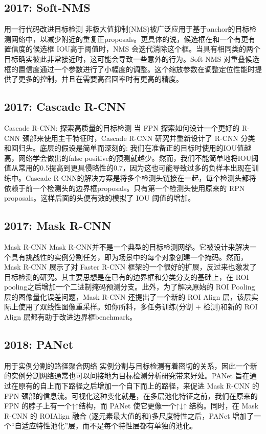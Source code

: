 \documentclass{article}
\begin{document}
	\subsection{2017: Soft-NMS}
	
	用一行代码改进目标检测
	非极大值抑制(NMS)被广泛应用于基于anchor的目标检测网络中，以减少附近的重复正proposals。更具体的说，候选框在和一个有更有置信度的候选框 IOU高于阈值时，NMS 会迭代消除这个框。当具有相同类的两个目标确实彼此非常接近时，这可能会导致一些意外的行为。Soft-NMS 对重叠候选框的置信度通过一个参数进行了小幅度的调整。这个缩放参数在调整定位性能时提供了更多的控制，并且在需要高召回率时有更高的精度。
	\subsection{2017: Cascade R-CNN}
	
	Cascade R-CNN: 探索高质量的目标检测
	当 FPN 探索如何设计一个更好的 R-CNN 颈部来使用主干特征时，Cascade R-CNN 研究并重新设计了 R-CNN 分类和回归头。底层的假设是简单而深刻的: 我们在准备正的目标时使用的IOU值越高，网络学会做出的false positive的预测就越少。然而，我们不能简单地将IOU阈值从常用的0.5提高到更具侵略性的0.7，因为这也可能导致过多的负样本出现在训练中。Cascade R-CNN的解决方案是将多个检测头链接在一起，每个检测头都将依赖于前一个检测头的边界框proposals。只有第一个检测头使用原来的 RPN proposals。这样后面的头便有效的模拟了 IOU 阈值的增加。
	\subsection{2017: Mask R-CNN}
	
	Mask R-CNN
	Mask R-CNN并不是一个典型的目标检测网络。它被设计来解决一个具有挑战性的实例分割任务，即为场景中的每个对象创建一个掩码。然而，Mask R-CNN 展示了对 Faster R-CNN 框架的一个很好的扩展，反过来也激发了目标检测的研究。其主要思想是在已有的边界框和分类分支的基础上，在 ROI pooling之后增加一个二进制掩码预测分支。此外，为了解决原始的 ROI Pooling 层的图像量化误差问题，Mask R-CNN 还提出了一个新的 ROI Align 层，该层实际上使用了双线性图像重采样。如你所料，多任务训练(分割 + 检测)和新的 ROI Align 层都有助于改进边界框benchmark。
	\subsection{2018: PANet}
	
	用于实例分割的路径聚合网络
	实例分割与目标检测有着密切的关系，因此一个新的实例分割网络通常也可以间接地为目标检测分析研究带来好处。PANet 旨在通过在原有的自上而下路径之后增加一个自下而上的路径，来促进 Mask R-CNN 的 FPN 颈部的信息流。可视化这种变化就是，在多层池化特征之前，我们在原来的 FPN 的脖子上有一个↑↑结构，而 PANet 使它更像一个↑↓↑ 结构。同时，在 Mask R-CNN 的 ROIAlign 融合 (逐元素最大值的和)多尺度特性之后，PANet 增加了一个“自适应特性池化”层，而不是每个特性层都有单独的池化。
\end{document}
